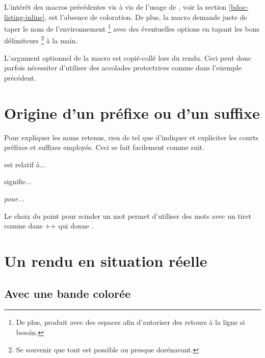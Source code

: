 \begin{bdocrem}
    L'intérêt des macros précédentes vis à vis de l'usage de , voir la section \ref{bdoc-listing-inline}, est l'absence de coloration.
    De plus, la macro  demande juste de taper le nom de l'environnement
    \footnote{
        De plus,  produit  avec des espaces afin d'autoriser des retours à la ligne si besoin.
    }
    avec des éventuelles options en tapant les bons délimiteurs
    \footnote{
        Se souvenir que tout est possible ou presque dorénavant.
    }
    à la main.
\end{bdocrem}


\begin{bdocwarn}
    L'argument optionnel de la macro  est copié-collé lors du rendu. Ceci peut donc parfois nécessiter d'utiliser des accolades protectrices comme dans l'exemple précédent. 
\end{bdocwarn}




\section{Origine d'un préfixe ou d'un suffixe}

Pour expliquer les noms retenus, rien de tel que d'indiquer et expliciter les courts préfixes et suffixes employés. Ceci se fait facilement comme suit.

\begin{bdoclatex}[sbs]
 est relatif à...

 signifie...

\emph{ pour...}
\end{bdoclatex}


\begin{bdocrem}
    Le choix du point pour scinder un mot permet d'utiliser des mots avec un tiret comme dans \bdocinlatex++ qui donne .
\end{bdocrem}


\section{Un rendu en situation réelle} \label{bdoc-showcase}

\subsection{Avec une bande colorée}

